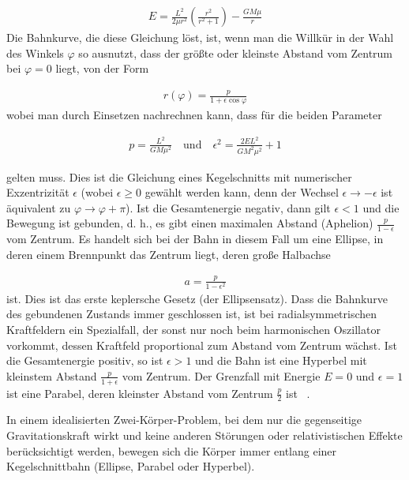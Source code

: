 \documentclass[a4paper,12pt,twoside]{article}
\begin{document}
\begin{align*}
	E = \frac{L^2}{2\mu r^2} \left( \frac{r^2}{r^2 + 1} \right) - \frac{GM\mu}{r}
\end{align*}
Die Bahnkurve, die diese Gleichung löst, ist, wenn man die Willkür in der Wahl des Winkels \( \varphi \) so ausnutzt, dass der größte oder kleinste Abstand vom Zentrum bei \( \varphi = 0 \) liegt, von der Form

\begin{align*}
	r(\varphi) = \frac{p}{1 + \epsilon \cos \varphi}
\end{align*}
wobei man durch Einsetzen nachrechnen kann, dass für die beiden Parameter

\begin{align*}
	p = \frac{L^2}{GM\mu^2} \quad \text{und} \quad \epsilon^2 = \frac{2E L^2}{GM^2 \mu^2} + 1
\end{align*}

gelten muss. Dies ist die Gleichung eines Kegelschnitts mit numerischer Exzentrizität \( \epsilon \) (wobei \( \epsilon \geq 0 \) gewählt werden kann, denn der Wechsel \( \epsilon \to -\epsilon \) ist äquivalent zu \( \varphi \to \varphi + \pi \)).
Ist die Gesamtenergie negativ, dann gilt \( \epsilon < 1 \) und die Bewegung ist gebunden, d. h., es gibt einen maximalen Abstand (Aphelion) \( \frac{p}{1 - \epsilon} \) vom Zentrum. Es handelt sich bei der Bahn in diesem Fall um eine Ellipse, in deren einem Brennpunkt das Zentrum liegt, deren große Halbachse

\begin{align*}
	a = \frac{p}{1 - \epsilon^2}
\end{align*}
ist. Dies ist das erste keplersche Gesetz (der Ellipsensatz). Dass die Bahnkurve des gebundenen Zustands immer geschlossen ist, ist bei radialsymmetrischen Kraftfeldern ein Spezialfall, der sonst nur noch beim harmonischen Oszillator vorkommt, dessen Kraftfeld proportional zum Abstand vom Zentrum wächst.
Ist die Gesamtenergie positiv, so ist \( \epsilon > 1 \) und die Bahn ist eine Hyperbel mit kleinstem Abstand \( \frac{p}{1 + \epsilon} \) vom Zentrum. Der Grenzfall mit Energie \( E = 0 \) und \( \epsilon = 1 \) ist eine Parabel, deren kleinster Abstand vom Zentrum \( \frac{p}{2} \) ist ~\cite{Krug2011}.

In einem idealisierten Zwei-Körper-Problem, bei dem nur die gegenseitige Gravitationskraft wirkt und keine anderen Störungen oder relativistischen Effekte berücksichtigt werden, bewegen sich die Körper immer entlang einer Kegelschnittbahn (Ellipse, Parabel oder Hyperbel).
\end{document}
